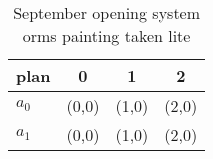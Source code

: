 \documentclass[a4paper]{article}
\begin{document}
\begin{table}
\begin{adjustbox}{width=0.6\columnwidth}
\begin{tabular}{|l|l|l|l|}
\hline
\textbf{plan} & \multicolumn{1}{c|}{\textbf{0}} & \multicolumn{1}{c|}{\textbf{1}} & \multicolumn{1}{c|}{\textbf{2}} \\ \hline
\textbf{$a_0$}  & (0,0) & (1,0) & (2,0) \\ \hline
\textbf{$a_1$}  & (0,0) & (1,0) & (2,0) \\ \hline
\end{tabular}
\end{adjustbox}
\caption{September opening system orms painting taken lite
}
\end{table}
\end{document}
